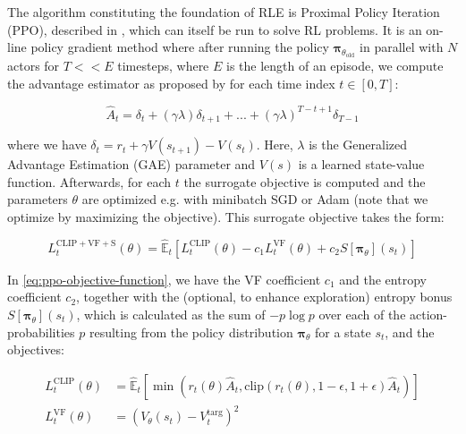 \noindent The algorithm constituting the foundation of RLE is Proximal Policy Iteration (PPO), described in \cite{ppo-paper}, which can itself be run to solve RL problems. It is an on-line policy gradient method where after running the policy $\boldsymbol{\pi}_{\theta_{\text{old}}}$ in parallel with $N$ actors for $T << E$ timesteps, where $E$ is the length of an episode, we compute the advantage estimator as proposed by \cite{generalized-advantage-estimation-paper} for each time index $t \in [0, T]$:

\begin{equation}
  \hat{A}_{t} = \delta_{t} + \left(\gamma \lambda\right) \delta_{t+1} + ... + \left(\gamma \lambda\right)^{T-t+1} \delta_{T - 1}
  \label{eq:ppo-advantage-estimator}
\end{equation}

\noindent where we have $\delta_{t} = r_{t} + \gamma V(s_{t+1}) - V(s_{t})$. Here, $\lambda$ is the Generalized Advantage Estimation (GAE) parameter and $V(s)$ is a learned state-value function. Afterwards, for each $t$ the surrogate objective is computed and the parameters $\theta$ are optimized e.g. with minibatch SGD or Adam (note that we optimize by maximizing the objective). This surrogate objective takes the form:

\begin{equation}
  L_{t}^{\text{CLIP} + \text{VF} + \text{S}}(\theta) = \hat{\mathbb{E}}_{t} \left[L_{t}^{\text{CLIP}}(\theta) - c_{1} L_{t}^{\text{VF}}(\theta) + c_{2} S[\boldsymbol{\pi}_{\theta}](s_{t})\right]
  \label{eq:ppo-objective-function}
\end{equation}

\noindent In \eqref{eq:ppo-objective-function}, we have the VF coefficient $c_{1}$ and the entropy coefficient $c_{2}$, together with the (optional, to enhance exploration) entropy bonus $S[\boldsymbol{\pi}_{\theta}](s_{t})$, which is calculated as the sum of $- p \log{p}$ over each of the action-probabilities $p$ resulting from the policy distribution $\boldsymbol{\pi}_{\theta}$ for a state $s_{t}$, and the objectives:

\begin{align}
  \label{eq:ppo-clip-objective} L_{t}^{\text{CLIP}}(\theta) &= \hat{\mathbb{E}}_{t}\left[\min\left(r_{t}(\theta) \hat{A}_{t}, \text{clip}\left(r_{t}(\theta), 1 - \epsilon, 1 + \epsilon\right) \hat{A}_{t}\right)\right]\\
  \label{eq:ppo-vf-objective} L_{t}^{\text{VF}}(\theta) &= \left(V_{\theta}(s_{t}) - V_{t}^{\text{targ}}\right)^{2}
\end{align}

